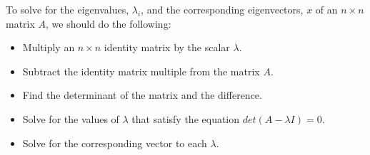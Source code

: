 \documentclass[fleqn]{article}
\begin{document}
\begin{enumerate}
\begin{itemize}
          \textcolor{hwColor}{
            To solve for the eigenvalues, $\lambda_i$, and the corresponding eigenvectors, $x$ of an $n \times n$ matrix 
            $A$, we should do the following: 
            \\
            \begin{itemize}
              \item Multiply an $n \times n$ identity matrix by the scalar $\lambda$.
              \item Subtract the identity matrix multiple from the matrix $A$.
              \item Find the determinant of the matrix and the difference.
              \item Solve for the values of $\lambda$ that satisfy the equation $det\left(A-\lambda I\right)=0$.
              \item Solve for the corresponding vector to each $\lambda$.
            \end{itemize}
          }


\end{itemize}
\end{enumerate}
\end{document}
